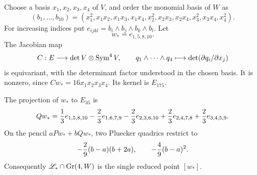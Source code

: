 Choose a basis \(x_1,x_2,x_3,x_4\) of \(V\), and order the
monomial basis of \(W\) as
\[
 (b_1,\ldots,b_{10})=
 (x_1^2,x_1x_2,x_1x_3,x_1x_4,x_2^2,
 x_2x_3,x_2x_4,x_3^2,x_3x_4,x_4^2).
\]
For increasing indices put \(e_{ijkl}=b_i\wedge b_j\wedge
b_k\wedge b_l\).  Let
\[
 w_*=e_{1,5,8,10}.
\]
The Jacobian map
\[
 C:E\longrightarrow\det V\otimes\operatorname{Sym}^4V,\qquad
 q_1\wedge\cdots\wedge q_4\longmapsto
 \det(\partial q_i/\partial x_j)
\]
is equivariant, with the determinant factor understood in the chosen
basis.  It is nonzero, since \(Cw_*=16x_1x_2x_3x_4\).
Its kernel is \(E_{175}\).

\begin{lemma}
\label{lem:exact-plucker-pencil}
The projection of \(w_*\) to \(E_{35}\) is
\begin{equation}\label{eq:exact-projector-witness}
 Qw_*={1\over3}e_{1,5,8,10}
       -{2\over3}e_{1,6,7,9}
       -{2\over3}e_{2,3,6,10}
       +{2\over3}e_{2,4,7,8}
       +{2\over3}e_{3,4,5,9}.
\end{equation}
On the pencil \(aPw_*+bQw_*\), two Pluecker quadrics restrict to
\begin{equation}\label{eq:two-separating-quadrics}
 -{2\over9}(b-a)(b+2a),\qquad
 -{4\over9}(b-a)^2.
\end{equation}
Consequently \(\mathscr L_*\cap\operatorname{Gr}(4,W)\) is the single
reduced point \([w_*]\).
\end{lemma}
